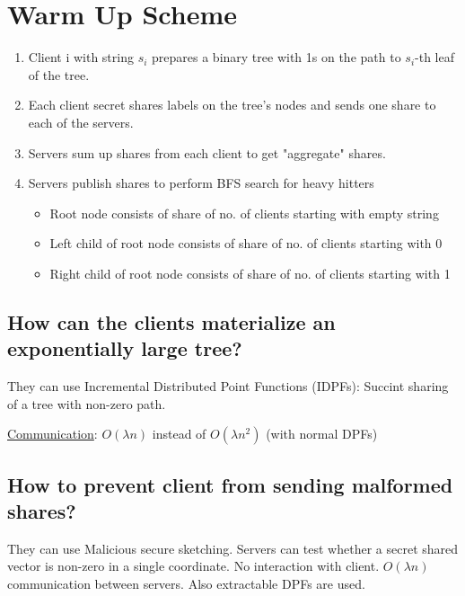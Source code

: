 \section{Warm Up Scheme}
\begin{enumerate}
    \item Client i with string $s_i$ prepares a binary tree with 1s on the path to $s_i$-th leaf of the tree.
    \item Each client secret shares labels on the tree's nodes and sends one share to each of the servers. 
    \item Servers sum up shares from each client to get "aggregate" shares.
    \item Servers publish shares to perform BFS search for heavy hitters
    \begin{itemize}
        \item Root node consists of share of no. of clients starting with empty string
        \item Left child of root node consists of share of no. of clients starting with 0
        \item Right child of root node consists of share of no. of clients starting with 1
    \end{itemize}
\end{enumerate}

\subsection{How can the clients materialize an exponentially large tree?}
They can use Incremental Distributed Point Functions (IDPFs): Succint sharing of a tree with non-zero path.

\underline{Communication}: $O(\lambda n)$ instead of $O (\lambda n^2)$ (with normal DPFs)

\subsection{How to prevent client from sending malformed shares?}
They can use Malicious secure sketching. Servers can test whether a secret shared vector is non-zero in a single coordinate. No interaction with client. $O(\lambda n)$ communication between servers. Also extractable DPFs are used.




%

